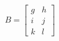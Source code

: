 \documentclass[preview]{standalone}
\begin{document}
\begin{align*}
B = \begin{bmatrix} g & h \\ i & j \\ k & l \end{bmatrix}
\end{align*}
\end{document}
